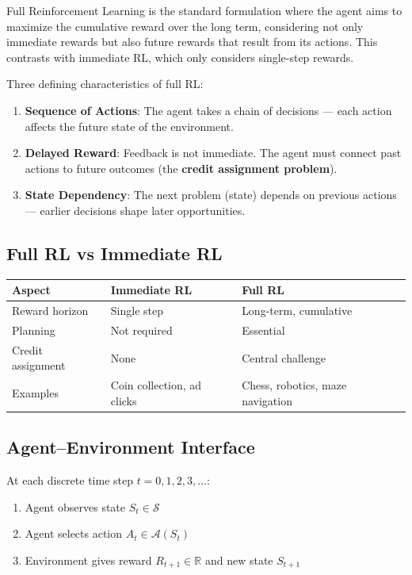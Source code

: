 \documentclass[11pt,a4paper]{article}
\begin{document}
Full Reinforcement Learning is the standard formulation where the agent aims to maximize the cumulative reward over the long term, considering not only immediate rewards but also future rewards that result from its actions. This contrasts with immediate RL, which only considers single-step rewards.

Three defining characteristics of full RL:
\begin{enumerate}
    \item \textbf{Sequence of Actions}: The agent takes a chain of decisions --- each action affects the future state of the environment.
    \item \textbf{Delayed Reward}: Feedback is not immediate. The agent must connect past actions to future outcomes (the \textbf{credit assignment problem}).
    \item \textbf{State Dependency}: The next problem (state) depends on previous actions --- earlier decisions shape later opportunities.
\end{enumerate}

\subsection{Full RL vs Immediate RL}

\begin{center}
\begin{tabular}{|l|l|l|}
\hline
\textbf{Aspect} & \textbf{Immediate RL} & \textbf{Full RL} \\ \hline
Reward horizon & Single step & Long-term, cumulative \\ \hline
Planning & Not required & Essential \\ \hline
Credit assignment & None & Central challenge \\ \hline
Examples & Coin collection, ad clicks & Chess, robotics, maze navigation \\ \hline
\end{tabular}
\end{center}

\subsection{Agent--Environment Interface}

At each discrete time step $t = 0, 1, 2, 3, \ldots$:
\begin{enumerate}
    \item Agent observes state $S_t \in \mathcal{S}$
    \item Agent selects action $A_t \in \mathcal{A}(S_t)$
    \item Environment gives reward $R_{t+1} \in \mathbb{R}$ and new state $S_{t+1}$
\end{enumerate}
\end{document}
